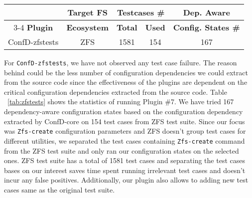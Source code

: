 \begin{table*}[t]
	\small
	\begin{center}
		\begin{tabular}{ c | c | c | c | c }
& \textbf{Target FS} & \multicolumn{2}{c|}{\textbf{Testcases \#}} &  \textbf{Dep. Aware} \\
        \cline{3-4}
    \textbf{Plugin} & \textbf{Ecosystem}  & \textbf{\space \space \space \space \space Total \space \space \space \space \space}  & \textbf{\space \space \space \space \space Used \space \space \space \space \space} & \textbf{Config. States \#}  \\
          \hline
ConfD-zfstests & ZFS  & 1581   & 154 & 167 \\
	\hline
		\end{tabular}
	\end{center}
	\caption{ {\bf Summary of ConfD-zfstests.}  This table summarizes the statistics of Plugin \#7 ConfD-zfstests.}
	\label{tab:zfstests}
\end{table*}

For \texttt{ConfD-zfstests}, we have not observed any test case failure. The reason behind could be the less number of configuration dependencies we could extract from the source code since the effectiveness of the plugins are dependent on the critical configuration dependencies extracted from the source code. 
Table ~\ref{tab:zfstests} shows the statistics of running Plugin \#7. We have tried 167 dependency-aware configuration states based on the configuration dependency extracted by ConfD-core on 154 test cases from ZFS test suite. Since our focus was \texttt{Zfs-create} configuration parameters and ZFS doesn't group test cases for different utilities, we separated the test cases containing \texttt{Zfs-create} command from the ZFS test suite and only ran our configuration states on the selected ones. ZFS test suite has a total of 1581 test cases and separating the test cases bases on our interest saves time spent running irrelevant test cases and doesn't incur any false positives. Additionally, our plugin also allows to adding new test cases same as the original test suite.

